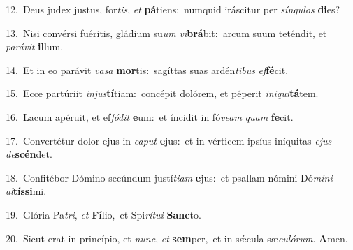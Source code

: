 {\numbfont\textcolor{\numbcolor}{12.}}~Deus judex justus, for\-\textit{tis}\-, \textit{et} \textbf{pá}\-tiens:~\star numquid iráscitur per \textit{sín}\-\textit{gu}\textit{los} \textbf{di}\-es?\par
{\numbfont\textcolor{\numbcolor}{13.}}~Nisi convérsi fuéritis, gládium su\textit{um} \textit{vi}\-\textbf{brá}bit:~\star arcum suum teténdit, et \textit{pa}\-\textit{rá}\textit{vit} \textbf{il}\-lum.\par
{\numbfont\textcolor{\numbcolor}{14.}}~Et in eo parávit \textit{va}\-\textit{sa} \textbf{mor}\-tis:~\star sagíttas suas ardén\-\textit{ti}\-\textit{bus} \textit{ef}\-\textbf{fé}cit.\par
{\numbfont\textcolor{\numbcolor}{15.}}~Ecce partúriit \textit{in}\-\textit{jus}\textbf{tí}tiam:~\star concépit dolórem, et péperit \textit{in}\-\textit{i}\textit{qui}\textbf{tá}tem.\par
{\numbfont\textcolor{\numbcolor}{16.}}~Lacum apéruit, et ef\-\textit{fó}\-\textit{dit} \textbf{e}\-um:~\star et íncidit in fó\-\textit{ve}\-\textit{am} \textit{quam} \textbf{fe}\-cit.\par
{\numbfont\textcolor{\numbcolor}{17.}}~Convertétur dolor ejus in \textit{ca}\-\textit{put} \textbf{e}\-jus:~\star et in vérticem ipsíus iníquitas \textit{e}\-\textit{jus} \textit{de}\-\textbf{scén}det.\par
{\numbfont\textcolor{\numbcolor}{18.}}~Confitébor Dómino secúndum justí\-\textit{ti}\-\textit{am} \textbf{e}\-jus:~\star et psallam nómini Dó\-\textit{mi}\-\textit{ni} \textit{al}\-\textbf{tís}\textbf{si}mi.\par
{\numbfont\textcolor{\numbcolor}{19.}}~Glória Pa\-\textit{tri}\-, \textit{et} \textbf{Fí}\-lio,~\star et Spi\-\textit{rí}\-\textit{tu}\textit{i} \textbf{Sanc}\-to.\par
{\numbfont\textcolor{\numbcolor}{20.}}~Sicut erat in princípio, et \textit{nunc}\-, \textit{et} \textbf{sem}\-per,~\star et in sǽcula sæ\-\textit{cu}\-\textit{ló}\textit{rum}. \textbf{A}\-men.\par
